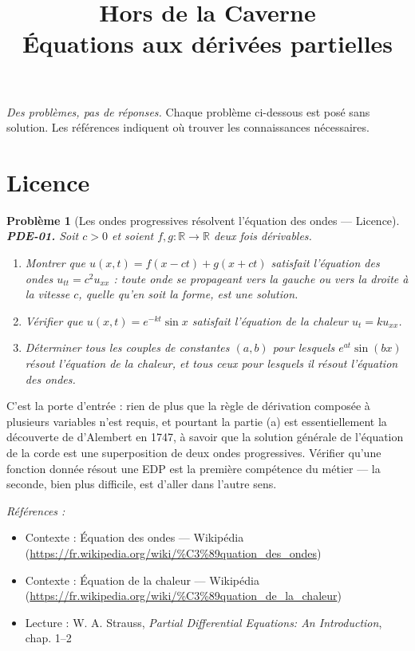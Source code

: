 \documentclass[11pt]{article}
\title{Hors de la Caverne \\ \Large Équations aux dérivées partielles}
\author{}
\date{}
\newtheorem{problem}{Problème}
\newenvironment{refs}{\par\small\noindent\emph{Références :}\begin{itemize}\setlength\itemsep{0pt}}{\end{itemize}\normalsize}
\begin{document}
\maketitle
\noindent\emph{Des problèmes, pas de réponses.} Chaque problème ci-dessous est posé
sans solution. Les références indiquent où trouver les connaissances nécessaires.
\medskip


\section*{Licence}

\begin{problem}[{Les ondes progressives résolvent l'équation des ondes --- Licence}]
\textbf{PDE-01.} Soit $c > 0$ et soient $f, g : \mathbb{R} \to \mathbb{R}$
deux fois dérivables.
\begin{enumerate}
\item[(a)] Montrer que $u(x,t) = f(x-ct) + g(x+ct)$ satisfait l'équation
des ondes $u_{tt} = c^2 u_{xx}$ : toute onde se propageant vers la gauche ou vers la droite à
la vitesse $c$, quelle qu'en soit la forme, est une solution.
\item[(b)] Vérifier que $u(x,t) = e^{-kt}\sin x$ satisfait
l'équation de la chaleur $u_t = k u_{xx}$.
\item[(c)] Déterminer tous les couples de constantes $(a,b)$ pour
lesquels $e^{at}\sin(bx)$ résout l'équation de la chaleur, et tous ceux pour lesquels il résout
l'équation des ondes.
\end{enumerate}

\end{problem}

\noindent C'est la porte d'entrée : rien de plus que la règle de dérivation composée à
plusieurs variables n'est requis, et pourtant la partie (a) est essentiellement la découverte de
d'Alembert en 1747, à savoir que la solution générale de l'équation de la corde est une
superposition de deux ondes progressives. Vérifier qu'une fonction donnée résout une EDP est la
première compétence du métier --- la seconde, bien plus difficile, est d'aller dans l'autre
sens.

\begin{refs}
\item Contexte : Équation des ondes --- Wikipédia (\url{https://fr.wikipedia.org/wiki/%C3%89quation_des_ondes})
\item Contexte : Équation de la chaleur --- Wikipédia (\url{https://fr.wikipedia.org/wiki/%C3%89quation_de_la_chaleur})
\item Lecture : W. A. Strauss, \textit{Partial Differential Equations: An Introduction}, chap. 1--2
\end{refs}
\end{document}

